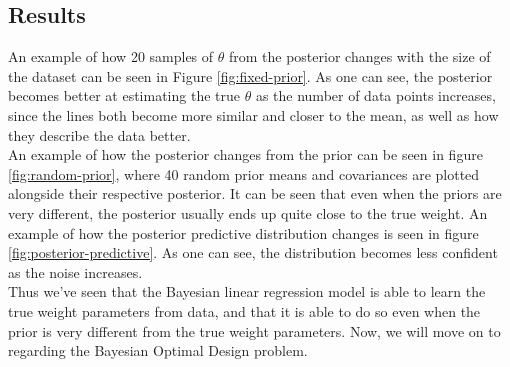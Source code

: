 \subsection{Results}
An example of how 20 samples of $\theta$ from the posterior changes with the size of the dataset can be seen in Figure \ref{fig:fixed-prior}.
As one can see, the posterior becomes better at estimating the true $\theta$ as the number of data points increases,
since the lines both become more similar and closer to the mean, as well as how they describe the data better. \\
An example of how the posterior changes from the prior can be seen in figure \ref{fig:random-prior}, where 40 random prior means and covariances are plotted alongside their respective posterior.
It can be seen that even when the priors are very different, the posterior usually ends up quite close to the true weight.
An example of how the posterior predictive distribution changes is seen in figure \ref{fig:posterior-predictive}.
As one can see, the distribution becomes less confident as the noise increases. \\
Thus we've seen that the Bayesian linear regression model is able to learn the true weight parameters from data, and that it is able to do so even when the prior is very different from the true weight parameters. Now, we will move on to regarding the Bayesian Optimal Design problem.

